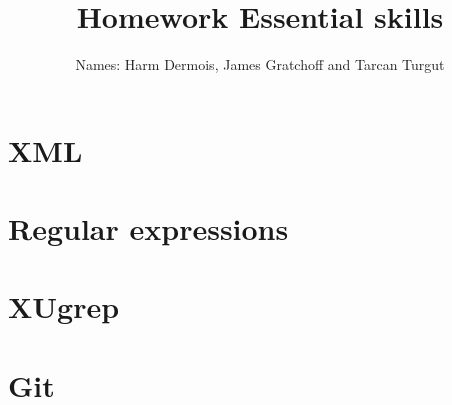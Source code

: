 \documentclass[12pt,a4paper]{article}
\begin{document}
\title{Homework Essential skills}
\author{Names: Harm Dermois, James Gratchoff and Tarcan Turgut }
\date{}
\maketitle

\section{XML}

\section{Regular expressions}

\section{XUgrep}

\section{Git}
\end{document}
